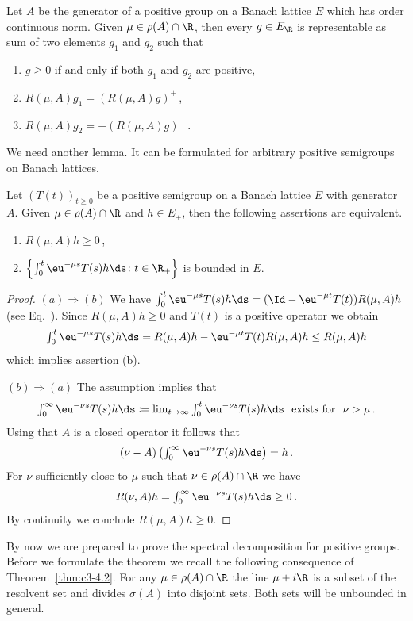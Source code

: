 \begin{lemma}\label{lem:c3-4.6}
Let $A$ be the generator of a positive group on a Banach
lattice $E$ which has order continuous norm. Given $\mu \in \rho(A) \cap \R $, then
every $g \in E_{\R }$ is representable as sum of two elements $g_1$ and $g_2$
such that
\begin{enumerate}[\upshape (i)]
	\item 
	$g \geq 0$ if and only if both $g_1$ and $g_2$ are positive,
	
	\item
	$R(\mu,A)g_1 = (R(\mu,A)g)^+$\,,

	\item
	$R(\mu,A)g_2 = -(R(\mu,A)g)^-$\,.
\end{enumerate}	
\end{lemma}
We need another lemma. It can be formulated for arbitrary positive
semigroups on Banach lattices.

\begin{lemma}\label{lem:c3-4.7}
Let $(T(t))_{t \geq 0}$ be a positive semigroup on a Banach
lattice $E$ with generator $A$. Given $\mu \in \rho(A) \cap \R $ and $h \in E_+$, then the following assertions are equivalent.
\begin{enumerate}[\upshape (a)]
	\item 
	$R(\mu,A)h \geq 0$\,,

	\item 
	$\left\{\int_{0}^{t} \eu^{-\mu s}T(s)h \ds \colon t \in \R _+\right\}$ is bounded in $E$.
\end{enumerate}
\end{lemma}
\begin{proof}
$(a)\Rightarrow(b)$  We have
$\int_{0}^{t} \eu^{-\mu s}T(s)h \ds = (\Id - \eu^{-\mu t}T(t))R(\mu,A)h$ 
(see Eq.~).
%
Since $R(\mu,A)h \geq 0$ and $T(t)$ is a positive operator we obtain
\[\textstyle
\int_{0}^{t} \eu^{-\mu s}T(s)h \ds = R(\mu,A)h - \eu^{-\mu t}T(t)R(\mu,A)h \leq R(\mu,A)h
\] 
which implies assertion (b).

$(b)\Rightarrow(a)$  The assumption implies that 
\[\textstyle
\int_{0}^{\infty} \eu^{-\nu s}T(s)h \ds \coloneqq 
\lim_{t \to \infty} \int_{0}^{t} \eu^{-\nu s}T(s)h \ds \ \text{ exists for } \ \nu > \mu\,. 
\]
Using that $A$ is a closed operator it follows that 
\[\textstyle
(\nu - A)\left(\int_{0}^{\infty} \eu^{-\nu s}T(s)h \ds\right) = h\,.
\]
For $\nu$
sufficiently close to $\mu$ such that $\nu \in \rho(A) \cap \R $ we have 
\[\textstyle
R(\nu,A)h = \int_{0}^{\infty} \eu^{-\nu s}T(s)h \ds \geq 0\,. 
\] 
By continuity we conclude $R(\mu,A)h \geq 0$.
\end{proof}
By now we are prepared to prove the spectral decomposition for positive groups. Before we formulate the theorem we recall the following
consequence of Theorem~\ref{thm:c3-4.2}. For any $\mu \in \rho(A) \cap \R $ the line $\mu+i\R $ is a
subset of the resolvent set and divides $\sigma(A)$ into disjoint sets.
Both sets will be unbounded in general.

